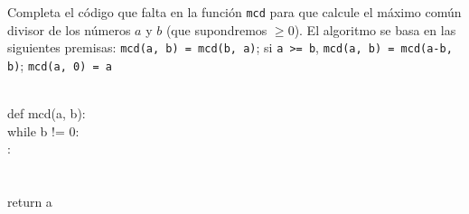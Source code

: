 \documentclass[10pt]{examdesign}
\newcommand{\tab}{\hspace*{2em}}
\begin{document}
\pagebreak




\begin{fillin}
[title={Rellena el código que falta (1 punto)}, 
suppressprefix]

\begin{question}[0.5 pt]
  Completa el código que falta en la función 
  \lstinline{mcd} para que calcule el máximo común divisor de 
  los números $a$ y $b$ (que supondremos $\geq 0$).
  El algoritmo se basa en las siguientes premisas: \lstinline{mcd(a, b) = mcd(b, a)};
  si \lstinline{a >= b}, \lstinline{mcd(a, b) = mcd(a-b, b)}; 
  \lstinline{mcd(a, 0) = a} \\~\\
  
    {\sffamily
    def mcd(a, b):\\
    \tab while b != 0:\\
        \tab\tab {}:\\
            \tab\tab\tab  {}\\
        \tab\tab {}\\
    \tab return a 
            
  }
\end{question}



\end{fillin}
\end{document}

